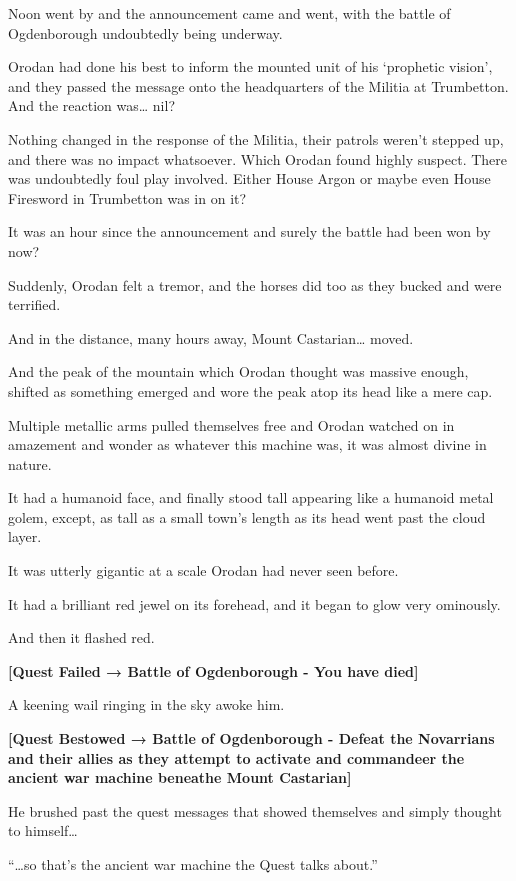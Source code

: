 \documentclass[a4paper,10pt]{book}
\begin{document}
Noon went by and the announcement came and went, with the battle of Ogdenborough undoubtedly being underway.\par
Orodan had done his best to inform the mounted unit of his ‘prophetic vision’, and they passed the message onto the headquarters of the Militia at Trumbetton. And the reaction was… nil?\par
Nothing changed in the response of the Militia, their patrols weren’t stepped up, and there was no impact whatsoever. Which Orodan found highly suspect. There was undoubtedly foul play involved. Either House Argon or maybe even House Firesword in Trumbetton was in on it?\par
It was an hour since the announcement and surely the battle had been won by now?\par
Suddenly, Orodan felt a tremor, and the horses did too as they bucked and were terrified.\par
And in the distance, many hours away, Mount Castarian… moved.\par
And the peak of the mountain which Orodan thought was massive enough, shifted as something emerged and wore the peak atop its head like a mere cap.\par
Multiple metallic arms pulled themselves free and Orodan watched on in amazement and wonder as whatever this machine was, it was almost divine in nature.\par
It had a humanoid face, and finally stood tall appearing like a humanoid metal golem, except, as tall as a small town’s length as its head went past the cloud layer.\par
It was utterly gigantic at a scale Orodan had never seen before.\par
It had a brilliant red jewel on its forehead, and it began to glow very ominously.\par
And then it flashed red.\par
\textbf{[Quest Failed → Battle of Ogdenborough - You have died]}\par
\par
A keening wail ringing in the sky awoke him.\par
\textbf{[Quest Bestowed → Battle of Ogdenborough - Defeat the Novarrians and their allies as they attempt to activate and commandeer the ancient war machine beneathe Mount Castarian]}\par
He brushed past the quest messages that showed themselves and simply thought to himself…\par
“…so that’s the ancient war machine the Quest talks about.”\par
\end{document}
